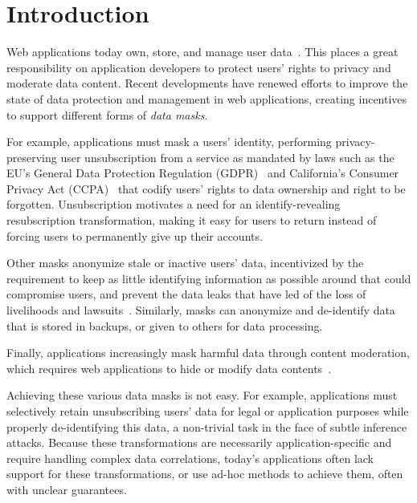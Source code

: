 \section{Introduction}
Web applications today own, store, and manage user data~\cite{nytimes:fb, npr:data}. 
This places a great responsibility on application developers to protect users' rights to privacy and
moderate data content.
%
Recent developments have renewed efforts to improve the state of data protection and management in
web applications, creating incentives to support different forms of \emph{data masks}. 

For example, applications must mask a users' identity, performing privacy-preserving user
unsubscription from a service as mandated by laws such as the EU's General Data Protection
Regulation (GDPR)~\cite{eu:gdpr} and California's Consumer Privacy Act (CCPA)~\cite{ca:privacy-act}
that codify users' rights to data ownership and right to be forgotten.  Unsubscription motivates a
need for an identify-revealing resubscription transformation, making it easy for users to return
instead of forcing users to permanently give up their accounts.

Other masks anonymize stale or inactive users' data, incentivized by the
requirement to keep as little identifying information as possible around that could compromise
users, and prevent the data leaks that have led of the loss of livelihoods and
lawsuits~\cite{breach:amazon,breach:twitter, breach:fb, breach:marriott, breach:quora}.
Similarly, masks can anonymize and de-identify data that is stored in backups, or given to others
for data processing.

Finally, applications increasingly mask harmful data through content moderation, which requires web
applications to hide or modify data contents~\cite{contentmod, sasb}.

Achieving these various data masks is not easy.  For example, applications must
selectively retain unsubscribing users' data for legal or application purposes while properly
de-identifying this data, a non-trivial task in the face of subtle inference attacks.  Because these
transformations are necessarily application-specific and require handling complex data correlations,
today's applications often lack support for these transformations, or use ad-hoc methods to achieve
them, often with unclear guarantees.

